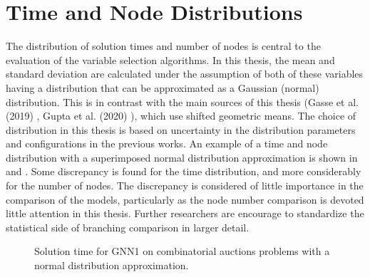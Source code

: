 \chapter{Time and Node Distributions}\label{cha:dists}
%

The distribution of solution times and number of nodes is central to the evaluation of the variable selection algorithms. In this thesis, the mean and standard deviation are calculated under the assumption of both of these variables having a distribution that can be approximated as a Gaussian (normal) distribution. This is in contrast with the main sources of this thesis (Gasse et al. (2019) \cite{gasse2019exact}, Gupta et al. (2020) \cite{gupta2020hybrid}), which use shifted geometric means. The choice of distribution in this thesis is based on uncertainty in the distribution parameters and configurations in the previous works. An example of a time and node distribution with a superimposed normal distribution approximation is shown in  and . Some discrepancy is found for the time distribution, and more considerably for the number of nodes. The discrepancy is considered of little importance in the comparison of the models, particularly as the node number comparison is devoted little attention in this thesis. Further researchers are encourage to standardize the statistical side of branching comparison in larger detail. 

\newcommand\gauss[2]{1/(#2*sqrt(2*pi))*exp(-((x-#1)^2)/(2*#2^2))}

\begin{figure}[ht]
\centering
    \caption{Solution time for GNN1 on combinatorial auctions problems with a normal distribution approximation.}
    \label{fig:histogram_time}
\end{figure}

